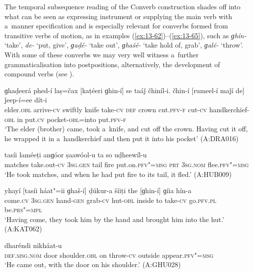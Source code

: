  The temporal subsequence reading of the Converb construction shades off into what can be seen as expressing instrument or supplying the main verb with a~manner specification and is especially relevant for converbs formed from transitive verbs of motion, as in examples (\ref{ex:13-62})--(\ref{ex:13-65}), such as \textit{ɡhín-} `take', \textit{de-} `put, give', \textit{ɡaḍé-} `take out', \textit{ɡhašé-} `take hold of, grab', \textit{ɡalé-} `throw'. With some of these converbs we may very well witness a~further grammaticalisation into postpositions, alternatively, the development of compound verbs (see ). 

\begin{exe}
\ex
\label{ex:13-62}
\gll ɡhaḍeerá phed-í laṣ=čax [kaṭéeri ɡhin-í] se taáǰ čhiníl-i. čhin-í [rumeel-í maǰí de] ǰeep-í=ee dít-i \\
elder.\textsc{obl} arrive-\textsc{cv} swiftly knife take-\textsc{cv} \textsc{def} crown cut.\textsc{pfv-f} cut-\textsc{cv} handkerchief-\textsc{obl} in put.\textsc{cv} pocket-\textsc{obl}=into put.\textsc{pfv-f} \\
\glt `The elder (brother) came, took a~knife, and cut off the crown. Having cut it off, he wrapped it in a~handkerchief and then put it into his pocket' (A:DRA016)

\ex
\label{ex:13-63}
 tasíi laméeṭi anɡóor ṣaawóol-u ta so uḍheewíl-u \\
matches take.out-\textsc{cv} \textsc{3sg.gen} tail fire put.on.\textsc{pfv"=msg}  \textsc{prt } \textsc{3sg.nom} flee.\textsc{pfv"=msg} \\
\glt `He took matches, and when he had put fire to its tail, it fled.' (A:HUB009)

\ex
\label{ex:13-64}
\gll yhayí [tasíi háat"=ii ɡhaš-í] ḍúkur-a šíiṭi the [ɡhin-í] ɡíia hín-a  \\
come.\textsc{cv} \textsc{3sg.gen} hand-\textsc{gen} grab-\textsc{cv} hut-\textsc{obl} inside to  take-\textsc{cv} go.\textsc{pfv.pl} be.\textsc{prs"=mpl} \\
\glt `Having come, they took him by the hand and brought him into the hut.' (A:KAT062)

\ex
\label{ex:13-65}
 dharéndi nikháat-u \\
\textsc{def.msg.nom} door shoulder.\textsc{obl} on throw-\textsc{cv} outside appear.\textsc{pfv"=msg} \\
\glt `He came out, with the door on his shoulder.' (A:GHU028) 
\end{exe}

